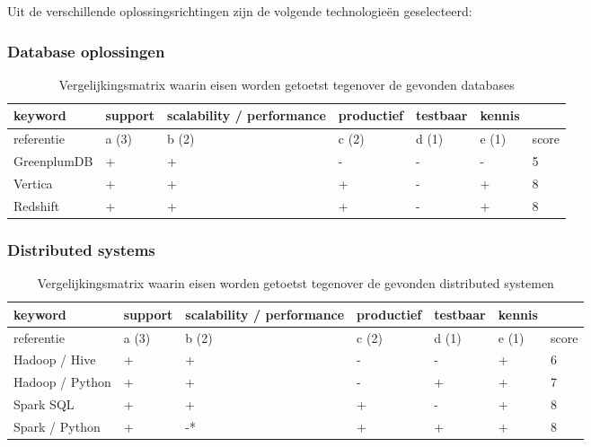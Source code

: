 Uit de verschillende oplossingsrichtingen zijn de volgende technologieën geselecteerd:

\subsubsection{Database oplossingen}

\begin{table}[bh]
\caption{Vergelijkingsmatrix waarin eisen worden getoetst tegenover de gevonden databases}
\label{tab:matrix_databasese}
\begin{tabular}{|p{3cm}|l|l|l|l|l|l|}
\hline
keyword     & support & scalability / performance & productief & testbaar & kennis &       \\ \hline
referentie  & a (3)   & b (2)                     & c (2)      & d (1)    & e (1)  & score \\ \hline
GreenplumDB & +       & +                         & -          & -        & -      & 5     \\ \hline
Vertica     & +       & +                         & +          & -        & +      & 8     \\ \hline
Redshift    & +       & +                         & +          & -        & +      & 8     \\ \hline
\end{tabular}
\end{table}

\subsubsection{Distributed systems}

\begin{table}[bh]
\caption{Vergelijkingsmatrix waarin eisen worden getoetst tegenover de gevonden distributed systemen}
\label{tab:matrix_distributed}
\begin{tabular}{|p{3cm}|l|l|l|l|l|l|}
\hline
keyword         & support & scalability / performance & productief & testbaar & kennis &       \\ \hline
referentie      & a (3)   & b (2)                     & c (2)      & d (1)    & e (1)  & score \\ \hline
Hadoop / Hive   & +       & +                         & -          & -        & +      & 6     \\ \hline
Hadoop / Python & +       & +                         & -          & +        & +      & 7     \\ \hline
Spark SQL       & +       & +                         & +          & -        & +      & 8     \\ \hline
Spark / Python  & +       & -*                        & +          & +        & +      & 8     \\ \hline
\end{tabular}
\end{table}

